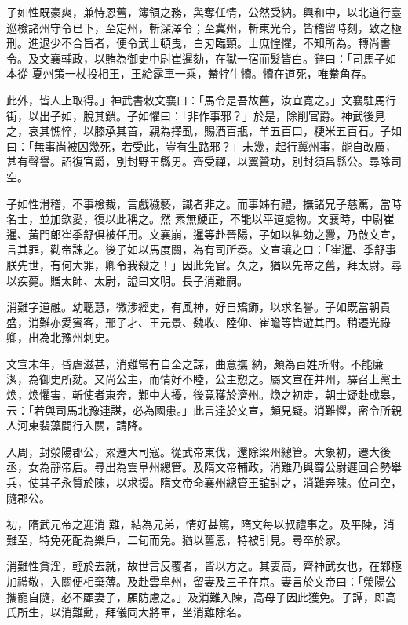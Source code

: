 \begin{pinyinscope}
 子如性既豪爽，兼恃恩舊，簿領之務，與奪任情，公然受納。興和中，以北道行臺巡檢諸州守令已下，至定州，斬深澤令；至冀州，斬東光令，皆稽留時刻，致之極刑。進退少不合旨者，便令武士頓曳，白刃臨頸。士庶惶懼，不知所為。轉尚書令。及文襄輔政，以賄為御史中尉崔暹劾，在獄一宿而髮皆白。辭曰：「司馬子如本從
 夏州策一杖投相王，王給露車一乘，觠牸牛犢。犢在道死，唯觠角存。



 此外，皆人上取得。」神武書敕文襄曰：「馬令是吾故舊，汝宜寬之。」文襄駐馬行街，以出子如，脫其鎖。子如懼曰：「非作事邪？」於是，除削官爵。神武後見之，哀其憔悴，以膝承其首，親為擇虱，賜酒百瓶，羊五百口，粳米五百石。子如曰：「無事尚被囚幾死，若受此，豈有生路邪？」未幾，起行冀州事，能自改厲，甚有聲譽。詔復官爵，別封野王縣男。齊受禪，以翼贊功，別封須昌縣公。尋除司空。



 子如性滑稽，不事檢裁，言戲穢褻，識者非之。而事姊有禮，撫諸兄子慈篤，當時名士，並加欽愛，復以此稱之。然
 素無鯁正，不能以平道處物。文襄時，中尉崔暹、黃門郎崔季舒俱被任用。文襄崩，暹等赴晉陽，子如以糾劾之釁，乃啟文宣，言其罪，勸帝誅之。後子如以馬度關，為有司所奏。文宣讓之曰：「崔暹、季舒事朕先世，有何大罪，卿令我殺之！」因此免官。久之，猶以先帝之舊，拜太尉。尋以疾薨。贈太師、太尉，謚曰文明。長子消難嗣。



 消難字道融。幼聰慧，微涉經史，有風神，好自矯飾，以求名譽。子如既當朝貴盛，消難亦愛賓客，邢子才、王元景、魏收、陸仰、崔瞻等皆遊其門。稍遷光祿卿，出為北豫州刺史。



 文宣末年，昏虐滋甚，消難常有自全之謀，曲意撫
 納，頗為百姓所附。不能廉潔，為御史所劾。又尚公主，而情好不睦，公主愬之。屬文宣在并州，驛召上黨王煥，煥懼害，斬使者東奔，鄴中大擾，後竟獲於濟州。煥之初走，朝士疑赴成皋，云：「若與司馬北豫連謀，必為國患。」此言達於文宣，頗見疑。消難懼，密令所親人河東裴藻間行入關，請降。



 入周，封滎陽郡公，累遷大司寇。從武帝東伐，還除梁州總管。大象初，遷大後丞，女為靜帝后。尋出為雲阜州總管。及隋文帝輔政，消難乃與蜀公尉遲回合勢舉兵，使其子永質於陳，以求援。隋文帝命襄州總管王誼討之，消難奔陳。位司空，隨郡公。



 初，隋武元帝之迎消
 難，結為兄弟，情好甚篤，隋文每以叔禮事之。及平陳，消難至，特免死配為樂戶，二旬而免。猶以舊恩，特被引見。尋卒於家。



 消難性貪淫，輕於去就，故世言反覆者，皆以方之。其妻高，齊神武女也，在鄴極加禮敬，入關便相棄薄。及赴雲阜州，留妻及三子在京。妻言於文帝曰：「滎陽公攜寵自隨，必不顧妻子，願防慮之。」及消難入陳，高母子因此獲免。子譚，即高氏所生，以消難勳，拜儀同大將軍，坐消難除名。




\end{pinyinscope}

